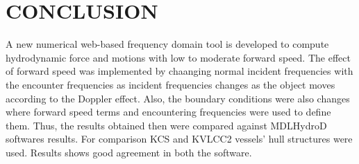 \chapter{CONCLUSION}

A new numerical web-based frequency domain tool is developed to compute hydrodynamic force 
and motions with low to moderate forward speed. The effect of forward speed was implemented by 
chaanging normal incident frequencies with the encounter frequencies as incident frequencies
changes as the object moves according to the Doppler effect. Also, the boundary conditions were also
changes where forward speed terms and encountering frequencies were used to define them. Thus, the 
results obtained then were compared against MDLHydroD softwares results. For comparison KCS and KVLCC2
vessels' hull structures were used. Results shows good agreement in both the software.